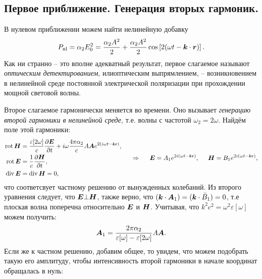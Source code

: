 \subsection{Первое приближение. Генерация вторых гармоник.}

В нулевом приближении можем найти нелинейную добавку
\begin{equation*}
    P_{\textnormal{nl}} = \alpha_2 E_0^2 = \frac{\alpha_2 A^2}{2} + \frac{\alpha_2 A^2}{2} \cos\left[2(\omega t - \mbox{\boldmath $k$} \cdot \mbox{\boldmath $r$})\right].
\end{equation*}
Как ни странно -- это вполне адекватный результат, первое слагаемое называют \textit{оптическим детектированием}, илиоптическим выпрямлением, -- возникновением в нелинейной среде постоянной электрической поляризации при прохождении мощной световой волны. 

Второе слагаемое гармонически меняется во времени. Оно вызывает \textit{генерацию второй гармоники в нелинейной среде}, т.е. волны с частотой $\omega_2 = 2 \omega$. Найдём поле этой гармоники:
\begin{equation*}
    \left.\begin{aligned}
        \rot \vc{H} &= \frac{\varepsilon[2\omega]}{c} \frac{\partial \vc{E}}{\partial t} + i \omega \frac{4 \pi \alpha_2}{c} A \vc{A} e^{2 (i \omega t - \smallvc{k} \smallvc{r})}, \\
        \rot \vc{E} &= \frac{1}{c}\frac{\partial \vc{H}}{\partial t}, \\
        \div \vc{E} &= \div \vc{H} = 0,
    \end{aligned}\right.
    \hspace{0.5cm} \Rightarrow \hspace{0.5cm}
    \vc{E} = A_1 e^{2 i (\omega t - \smallvc{k} \smallvc{r})},
    \hspace{5 mm} 
    \vc{H} = B_1 e^{2 i (\omega t - \smallvc{k} \smallvc{r})},
\end{equation*}
что соответсвует частному решению от вынужденных колебаний. Из второго уравнения следует, что $\mbox{\boldmath $E$} \bot \mbox{\boldmath $H$}$, также верно, что $(\mbox{\boldmath $k$} \cdot \mbox{\boldmath $A$}_1) = (\mbox{\boldmath $k$} \cdot \bar{B}_1)=0$, т.е плоская волна поперечна относительно $\mbox{\boldmath $E$}$ и $\mbox{\boldmath $H$}$. Учитывая, что $k^2 c^2 = \omega^2 \varepsilon[\omega]$ можем получить:
\begin{equation*}
    \mbox{\boldmath $A$}_1 = \frac{2 \pi \alpha_2}{\varepsilon[\omega]-\varepsilon[2\omega]} A \mbox{\boldmath $A$}.
\end{equation*}
Если же к частном решению, добавим общее, то увидем, что можем подобрать такую его амплитуду, чтобы интенсивность второй гармоники в начале координат обращалась в нуль:
